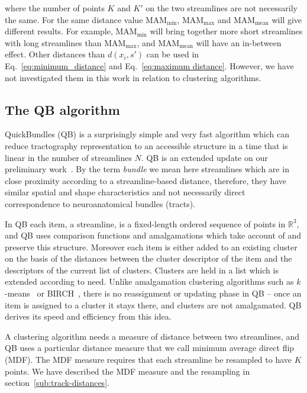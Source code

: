\documentclass{bioinfo}
\begin{document}
\begin{methods}
\noindent
where the number of points $K$ and $K'$ on the two streamlines are not
necessarily the same. For the same distance value
$\textrm{MAM}_{\textrm{min}}$, $\textrm{MAM}_{\textrm{max}}$ and
$\textrm{MAM}_{\textrm{mean}}$ will give different results. For example,
$\textrm{MAM}_{\textrm{min}}$ will bring together more short streamlines
with long streamlines than $\textrm{MAM}_{\textrm{max}}$, and
$\textrm{MAM}_{\textrm{mean}}$ will have an in-between effect.  Other
distances than $d(x_{i},s')$ can be used in
Eq.~\ref{eq:minimum_distance} and Eq.~\ref{eq:maximum distance}.
However, we have not investigated them in this work in relation to
clustering algorithms.

\subsection{The QB algorithm\label{sub:QB-description}}

QuickBundles (QB) is a surprisingly simple and very fast algorithm which
can reduce tractography representation to an accessible structure in a
time that is linear in the number of streamlines $N$. QB is an extended
update on our preliminary work~\citet{EGMB10}. By the term
\emph{bundle} we mean here streamlines which are in close proximity
according to a streamline-based distance, therefore, they have similar
spatial and shape characteristics and not necessarily direct
correspondence to neuroanatomical bundles (tracts).

In QB each item, a streamline, is a fixed-length ordered sequence of
points in $\mathbb{R}^{3}$, and QB uses comparison functions and
amalgamations which take account of and preserve this structure.
Moreover each item is either added to an existing cluster on the basis
of the distances between the cluster descriptor of the item and the
descriptors of the current list of clusters. Clusters are held in a list
which is extended according to need. Unlike amalgamation clustering
algorithms such as $k$-means~\citep{steinhaus1956division,
  macqueen1967some} or BIRCH~\citep{zhang1997birch}, there is no
reassignment or updating phase in QB -- once an item is assigned to a
cluster it stays there, and clusters are not amalgamated. QB derives its
speed and efficiency from this idea.

A clustering algorithm needs a measure of distance between two
streamlines, and QB uses a particular distance measure that we call
minimum average direct flip (MDF).  The MDF measure requires that each
streamline be resampled to have $K$ points. We have described the MDF measure
and the resampling in section~\ref{sub:track-distances}.


\end{methods}
\end{document}
